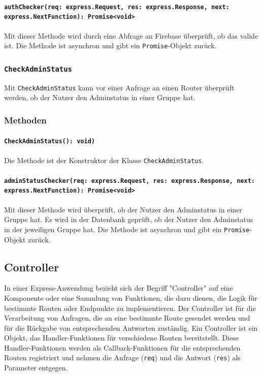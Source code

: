 \documentclass{entwurfsheft}
\begin{document}
\begin{sloppypar}
\paragraph{\texttt{authChecker(req: express.Request, res: express.Response, next: express.NextFunc\-tion): Promise<void>}}
Mit dieser Methode wird durch eine Abfrage an Firebase überprüft, ob das  valide ist. Die Methode ist asynchron und gibt ein \texttt{Promise}-Objekt zurück.

\subsubsection{\texttt{CheckAdminStatus}}\label{sec:CheckAdminStatus}
Mit \texttt{CheckAdminStatus} kann vor einer Anfrage an einen Router überprüft werden, ob der Nutzer den Adminstatus in einer Gruppe hat.
\subsubsection*{Methoden}
\paragraph{\texttt{CheckAdminStatus(): void)}}
Die Methode ist der Konstruktor der Klasse \texttt{CheckAdminStatus}.
\paragraph{\texttt{adminStatusChecker(req: express.Request, res: express.Response, next: express.\-NextFunction): Promise<void>}}
Mit dieser Methode wird überprüft, ob der Nutzer den Adminstatus in einer Gruppe hat. Es wird in der Datenbank geprüft, ob der Nutzer den Adminstatus in der jeweiligen Gruppe hat. Die Methode ist asynchron und gibt ein \texttt{Promise}-Objekt zurück.

\newpage

\subsection{Controller}\label{sec:Controller}
In einer Express-Anwendung bezieht sich der Begriff "Controller" auf eine Komponente oder eine Sammlung von Funktionen, die dazu dienen, die Logik für bestimmte Routen oder Endpunkte zu implementieren.
Der Controller ist für die Verarbeitung von Anfragen, die an eine bestimmte Route gesendet werden und für die Rückgabe von entsprechenden Antworten zuständig.
Ein Controller ist ein Objekt, das Handler-Funktionen für verschiedene Routen bereitstellt.
Diese Handler-Funktionen werden als Callback-Funktionen für die entsprechenden Routen registriert und nehmen die Anfrage (\texttt{req}) und die Antwort (\texttt{res}) als Parameter entgegen.



\end{sloppypar}
\end{document}
